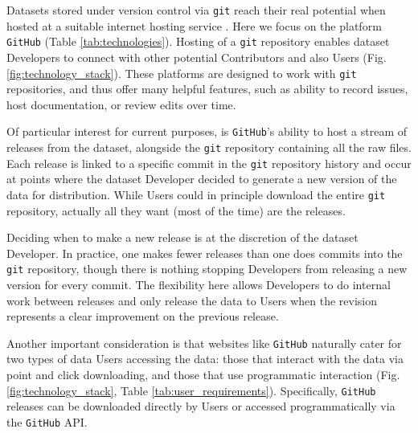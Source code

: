 \documentclass[a4paper,num-refs]{assets/oup-contemporary}
\begin{document}
Datasets stored under version control via \texttt{git} reach their real potential when hosted at a suitable internet hosting service \cite{Ram-2013,Perkel-2016}. Here we focus on the platform \texttt{GitHub} (Table \ref{tab:technologies}). Hosting of a \texttt{git} repository enables dataset Developers to connect with other potential Contributors and also Users (Fig. \ref{fig:technology_stack}). These platforms are designed to work with \texttt{git} repositories, and thus offer many helpful features, such as ability to record issues, host documentation, or review edits over time.

Of particular interest for current purposes, is \texttt{GitHub}'s ability to host a stream of releases from the dataset, alongside the \texttt{git} repository containing all the raw files. Each release is linked to a specific commit in the \texttt{git} repository history and occur at points where the dataset Developer decided to generate a new version of the data for distribution. While Users could in principle download the entire \texttt{git} repository, actually all they want (most of the time) are the releases.

Deciding when to make a new release is at the discretion of the dataset Developer. In practice, one makes fewer releases than one does commits into the \texttt{git} repository, though there is nothing stopping Developers from releasing a new version for every commit. The flexibility here allows Developers to do internal work between releases and only release the data to Users when the revision represents a clear improvement on the previous release.

Another important consideration is that websites like \texttt{GitHub} naturally cater for two types of data Users accessing the data: those that interact with the data via point and click downloading, and those that use programmatic interaction (Fig. \ref{fig:technology_stack}, Table \ref{tab:user_requirements}). Specifically, \texttt{GitHub} releases can be downloaded directly by Users or accessed programmatically via the \texttt{GitHub} API.
\end{document}
